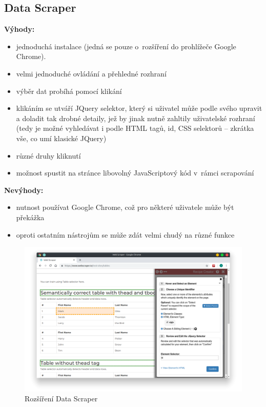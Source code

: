 \documentclass[thesis=B,czech]{FITthesis}[2012/06/26]
\begin{document}
\subsection{Data Scraper}
\textbf{Výhody:}
\begin{itemize}
	\item jednoduchá instalace (jedná se pouze o~rozšíření do prohlížeče Google Chrome).
	\item velmi jednoduché ovládání a přehledné rozhraní
	\item výběr dat probíhá pomocí klikání
	\item klikáním se utváří JQuery selektor, který si uživatel může podle svého upravit a doladit tak drobné detaily, jež by jinak nutně zahltily uživatelské rozhraní (tedy je možné vyhledávat i podle HTML tagů, id, CSS selektorů -- zkrátka vše, co umí klasické JQuery)
	\item různé druhy kliknutí
	\item možnost spustit na stránce libovolný JavaScriptový kód v~rámci scrapování
\end{itemize}
\textbf{Nevýhody:}
\begin{itemize}
	\item nutnost používat Google Chrome, což pro některé uživatele může být překážka
	\item oproti ostatním nástrojům se může zdát velmi chudý na různé funkce
\end{itemize}
\begin{figure}
	\includegraphics[width=\linewidth]{images/DataScraper.png}
	\caption{Rozšíření Data Scraper\cite[snímek pořídil autor]{data_scraper}}
	\label{fig:dataScraper}
\end{figure}
\end{document}
